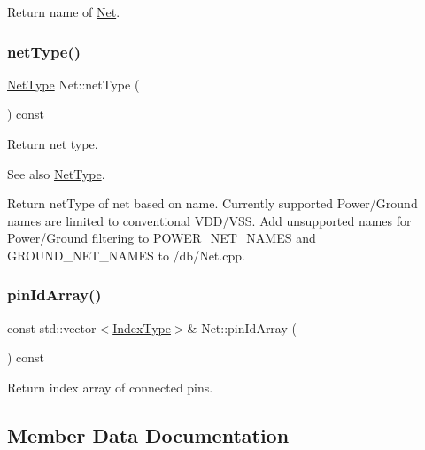 Return name of \hyperlink{classNet}{Net}. \mbox{\label{classNet_aa74b25d43e1b96f3596661325775f531}} 
\subsubsection{\texorpdfstring{net\+Type()}{netType()}}
{\footnotesize\ttfamily \hyperlink{type_8h_a24f31c8c9240242bd5fa9a415806eabf}{Net\+Type} Net\+::net\+Type (\begin{DoxyParamCaption}{ }\end{DoxyParamCaption}) const}



Return net type. 

\begin{DoxySeeAlso}{See also}
\hyperlink{type_8h_a24f31c8c9240242bd5fa9a415806eabf}{Net\+Type}.
\end{DoxySeeAlso}
Return net\+Type of net based on name. Currently supported Power/\+Ground names are limited to conventional V\+D\+D/\+V\+SS. Add unsupported names for Power/\+Ground filtering to P\+O\+W\+E\+R\+\_\+\+N\+E\+T\+\_\+\+N\+A\+M\+ES and G\+R\+O\+U\+N\+D\+\_\+\+N\+E\+T\+\_\+\+N\+A\+M\+ES to /db/\+Net.cpp. \mbox{\label{classNet_a5d7f652001fbd6a99613408fcba08328}} 
\subsubsection{\texorpdfstring{pin\+Id\+Array()}{pinIdArray()}}
{\footnotesize\ttfamily const std\+::vector$<$\hyperlink{type_8h_a581e8093e28e7362f2b6937296190676}{Index\+Type}$>$\& Net\+::pin\+Id\+Array (\begin{DoxyParamCaption}{ }\end{DoxyParamCaption}) const\hspace{0.3cm}{\ttfamily [inline]}}

Return index array of connected pins. 

\subsection{Member Data Documentation}
\mbox{\label{classNet_a510f27db002268fc15a1151cc9951c04}} 
